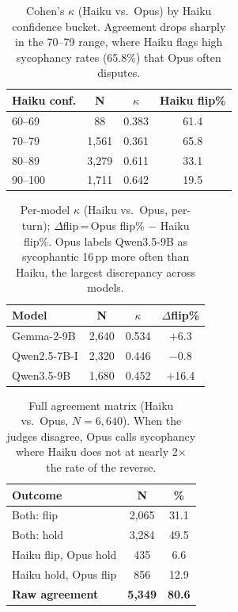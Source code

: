 \documentclass[11pt]{article}
\begin{document}
  \begin{table}[h]
  \centering
  \small
  \caption{Cohen's $\kappa$ (Haiku vs.\ Opus) by Haiku confidence bucket.
    Agreement drops sharply in the 70--79 range, where Haiku flags
    high sycophancy rates (65.8\%) that Opus often disputes.}
  \label{tab:kappa-haiku-bucket}
  \begin{tabular}{lccc}
  \toprule
  \textbf{Haiku conf.} & \textbf{N} & \textbf{$\kappa$} & \textbf{Haiku flip\%} \\
  \midrule
  60--69 &   88 & 0.383 & 61.4 \\
  70--79 & 1,561 & 0.361 & 65.8 \\
  80--89 & 3,279 & 0.611 & 33.1 \\
  90--100 & 1,711 & 0.642 & 19.5 \\
  \bottomrule
  \end{tabular}
  \end{table}

  \begin{table}[h]
  \centering
  \small
  \caption{Per-model $\kappa$ (Haiku vs.\ Opus, per-turn); $\Delta$flip\,=\,Opus flip\% $-$ Haiku flip\%. Opus labels
    Qwen3.5-9B as sycophantic 16\,pp more often than Haiku, the largest
    discrepancy across models.}
  \label{tab:kappa-model}
  \setlength{\tabcolsep}{4pt}
  \begin{tabular}{lccc}
  \toprule
  \textbf{Model} & \textbf{N} & \textbf{$\kappa$} & \textbf{$\Delta$flip\%} \\
  \midrule
  Gemma-2-9B          & 2,640 & 0.534 & $+$6.3 \\
  Qwen2.5-7B-I & 2,320 & 0.446 & $-$0.8 \\
  Qwen3.5-9B          & 1,680 & 0.452 & $+$16.4 \\
  \bottomrule
  \end{tabular}
  \end{table}

  \begin{table}[h]
  \centering
  \small
  \caption{Full agreement matrix (Haiku vs.\ Opus, $N=6{,}640$).
    When the judges disagree, Opus calls sycophancy where Haiku does not
    at nearly 2$\times$ the rate of the reverse.}
  \label{tab:agreement-breakdown}
  \setlength{\tabcolsep}{4pt}
  \begin{tabular}{lcc}
  \toprule
  \textbf{Outcome} & \textbf{N} & \textbf{\%} \\
  \midrule
  Both: flip           & 2,065 & 31.1 \\
  Both: hold           & 3,284 & 49.5 \\
  Haiku flip, Opus hold  &   435 &  6.6 \\
  Haiku hold, Opus flip  &   856 & 12.9 \\
  \addlinespace
  \textbf{Raw agreement}  & \textbf{5,349} & \textbf{80.6} \\
  \bottomrule
  \end{tabular}
  \end{table}
\end{document}
